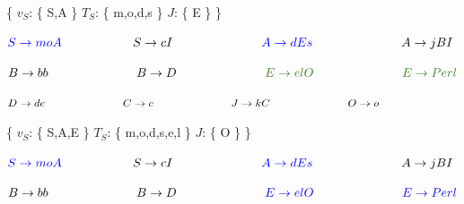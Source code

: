 \{ $ v_{S} $: \{ S,A \} \hspace{0.9cm} $ T_{S} $: \{ m,o,d,s \}  \hspace{0.9cm} $ J $: \{ E \} \} \newline \newline

$ \textcolor{blue}{ S \rightarrow moA } \hspace{2cm} \textcolor{black}{ S \rightarrow cI } \hspace{2.5cm} \textcolor{blue}{ A \rightarrow  dEs } \hspace{2.5cm} \textcolor{black}{ A \rightarrow  jBI }$ \newline

$ \textcolor{black}{ B \rightarrow bb } \hspace{2.5cm} \textcolor{black}{ B \rightarrow D } \hspace{2.5cm} \textcolor{OliveGreen}{ E \rightarrow  elO } \hspace{2.5cm} \textcolor{OliveGreen}{ E \rightarrow  Perl} $ \newline

$ \textcolor{black}{ D \rightarrow de } \hspace{2.5cm} \textcolor{black}{ C \rightarrow c} \hspace{2.5cm} \textcolor{black}{ J \rightarrow  kC } \hspace{2.5cm} \textcolor{black}{ O \rightarrow o } \hspace{2.5cm} $ \newline 

\{ $ v_{S} $: \{ S,A,E \} \hspace{0.9cm} $ T_{S} $: \{ m,o,d,s,e,l \}  \hspace{0.9cm} $ J $: \{ O \} \} \newline \newline

$ \textcolor{blue}{ S \rightarrow moA } \hspace{2cm} \textcolor{black}{ S \rightarrow cI } \hspace{2.5cm} \textcolor{blue}{ A \rightarrow  dEs } \hspace{2.5cm} \textcolor{black}{ A \rightarrow  jBI }$ \newline

$ \textcolor{black}{ B \rightarrow bb } \hspace{2.5cm} \textcolor{black}{ B \rightarrow D } \hspace{2.5cm} \textcolor{blue}{ E \rightarrow  elO } \hspace{2.5cm} \textcolor{blue}{ E \rightarrow  Perl} $ \newline

